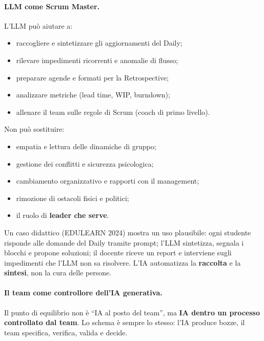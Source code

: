 \documentclass[12pt]{extarticle}
\begin{document}
\paragraph{LLM come Scrum Master.}
L'LLM può aiutare a:
\begin{itemize}
    \item raccogliere e sintetizzare gli aggiornamenti del Daily;
    \item rilevare impedimenti ricorrenti e anomalie di flusso;
    \item preparare agende e formati per la Retrospective;
    \item analizzare metriche (lead time, WIP, burndown);
    \item allenare il team sulle regole di Scrum (coach di primo livello).
\end{itemize}
\noindent Non può sostituire:
\begin{itemize}
    \item empatia e lettura delle dinamiche di gruppo;
    \item gestione dei conflitti e sicurezza psicologica;
    \item cambiamento organizzativo e rapporti con il management;
    \item rimozione di ostacoli fisici e politici;
    \item il ruolo di \textbf{leader che serve}.
\end{itemize}
\noindent Un caso didattico (EDULEARN 2024) mostra un uso plausibile: ogni studente risponde alle domande del Daily tramite prompt; l'LLM sintetizza, segnala i blocchi e propone soluzioni; il docente riceve un report e interviene sugli impedimenti che l'LLM non sa risolvere. L'IA automatizza la \textbf{raccolta} e la \textbf{sintesi}, non la cura delle persone.

\paragraph{Il team come controllore dell'IA generativa.}
Il punto di equilibrio non è ``IA al posto del team'', ma \textbf{IA dentro un processo controllato dal team}. Lo schema è sempre lo stesso: l'IA produce bozze, il team specifica, verifica, valida e decide.
\end{document}
